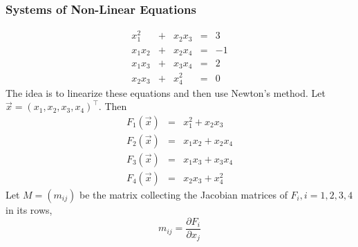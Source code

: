\documentclass[xcolor=dvipsnames]{beamer}
\begin{document}
\begin{frame}
  \frametitle{Systems of Non-Linear Equations}
  \begin{equation}
    \label{eq:ahxeemei}
    \begin{array}{ccccc}
x_{1}^{2}         & + & x_{2}x_{3} & = & 3    \\
x_{1}x_{2}        & + & x_{2}x_{4} & = & -1   \\
x_{1}x_{3}        & + & x_{3}x_{4} & = & 2    \\
x_{2}x_{3}        & + & x_{4}^{2}  & = & 0
    \end{array}
  \end{equation}
The idea is to linearize these equations and then use Newton's method.
Let $\vec{x}=(x_{1},x_{2},x_{3},x_{4})^{\intercal}$. Then
\begin{equation}
  \label{eq:ocheevoh}
  \begin{array}{ccc}
F_{1}(\vec{x}) & = & x_{1}^{2}+x_{2}x_{3}  \\
F_{2}(\vec{x}) & = & x_{1}x_{2}+x_{2}x_{4} \\
F_{3}(\vec{x}) & = & x_{1}x_{3}+x_{3}x_{4} \\
F_{4}(\vec{x}) & = & x_{2}x_{3}+x_{4}^{2} 
  \end{array}
\end{equation}
Let $M=\left(m_{ij}\right)$ be the matrix collecting the Jacobian matrices of
$F_{i},i=1,2,3,4$ in its rows,
\begin{equation}
  \label{eq:aewaimei}
 m_{ij}=\frac{\partial{}F_{i}}{\partial{}x_{j}} 
\end{equation}
\end{frame}
\end{document}
